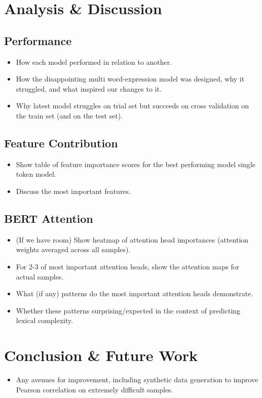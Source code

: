 \documentclass[11pt,a4paper]{article}
\begin{document}
\section{Analysis \& Discussion}

\subsection{Performance}

\begin{itemize}
  \item How each model performed in relation to another.
  \item How the disappointing multi word-expression model was designed, why it struggled, and what inspired our changes to it.
  \item Why latest model struggles on trial set but succeeds on cross validation on the train set (and on the test set).
\end{itemize}

\subsection{Feature Contribution}

\begin{itemize}
  \item Show table of feature importance scores for the best performing model single token model.
  \item Discuss the most important features.
\end{itemize}

\subsection{BERT Attention}

\begin{itemize}
  \item (If we have room) Show heatmap of attention head importances (attention weights averaged across all samples).
  \item For 2-3 of most important attention heads, show the attention maps for actual samples.
  \item What (if any) patterns do the most important attention heads demonstrate.
  \item Whether these patterns surprising/expected in the context of predicting lexical complexity.
\end{itemize}

\section{Conclusion \& Future Work}
\begin{itemize}
  \item Any avenues for improvement, including synthetic data generation to improve Pearson correlation on extremely difficult samples.
\end{itemize}




\end{document}
